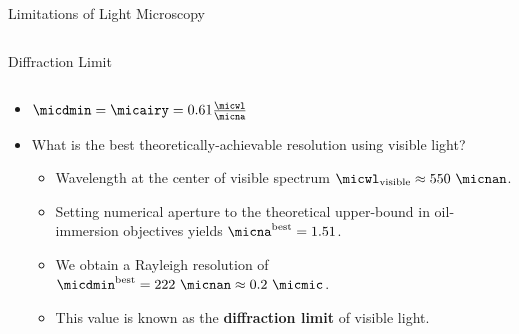 \begin{frame}[c]{Limitations of Light Microscopy}
\begin{columns}[c,onlytextwidth]
	\end{columns}
\end{frame}
\begin{frame}[c]{Diffraction Limit}
	\begin{columns}[T,onlytextwidth]

		\begin{column}{0.99\textwidth}
			\begin{itemize}
				\setlength\itemsep{0.4cm}
				\item<1-> $\micdmin = \micairy = 0.61\frac{\micwl}{\micna}$

				\item<2-> What is the best theoretically-achievable resolution using visible light?
				      \vspace{0.4cm}

				      \begin{itemize}
					      \setlength\itemsep{0.4cm}
					      \item<3-> Wavelength at the center of visible spectrum $\micwl_{\text{visible}} \approx 550~\micnan$.
					      \item<4-> Setting numerical aperture to the theoretical upper-bound in oil-immersion objectives yields $\micna^{\text{best}} = 1.51$.
					      \item<5-> We obtain a Rayleigh resolution of $\micdmin^{\text{best}} = 222~\micnan \approx 0.2~\micmic$.
					      \item<6-> This value is known as the \textbf{diffraction limit} of visible light.
				      \end{itemize}
			\end{itemize}
		\end{column}


	\end{columns}
\end{frame}


